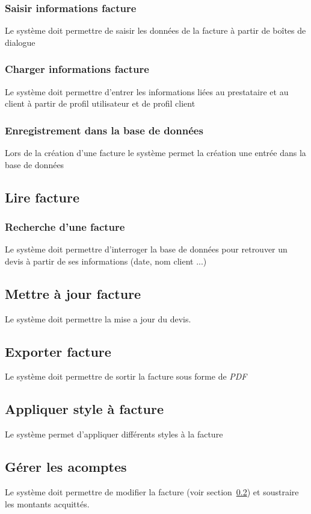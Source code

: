 \documentclass{article}
\begin{document}
    \subsubsection{Saisir informations facture}
    Le système doit permettre de saisir les données  de la facture à partir de
    boîtes de dialogue
    \subsubsection{Charger informations facture}
    Le système doit permettre d'entrer les informations liées au prestataire et au client à partir
    de profil utilisateur et de profil client
    \subsubsection{Enregistrement dans la base de données}
    Lors de la création d'une facture le système permet la création une entrée dans la base de données
    \subsection{Lire facture}
    \subsubsection{Recherche d'une facture}
    Le système doit permettre d'interroger la base de données pour retrouver
    un devis à partir de ses informations (date, nom client ...)
    \subsection{Mettre à jour facture} \label{ss:majf}
    Le système doit permettre la mise a jour du devis.
    \subsection{Exporter facture}
    Le système doit permettre de sortir la facture sous forme de \emph{PDF}
    \subsection{Appliquer style à facture}
    Le système permet d'appliquer différents styles à la facture
    \subsection{Gérer les acomptes}
    Le système doit permettre de modifier la facture (voir section~\ref{ss:majf}) et soustraire les montants acquittés.
    
\end{document}
